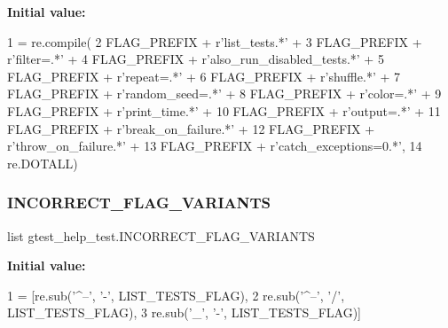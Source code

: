 {\bfseries Initial value\+:}
\begin{DoxyCode}
1 =  re.compile(
2     FLAG\_PREFIX + \textcolor{stringliteral}{r'list\_tests.*'} +
3     FLAG\_PREFIX + \textcolor{stringliteral}{r'filter=.*'} +
4     FLAG\_PREFIX + \textcolor{stringliteral}{r'also\_run\_disabled\_tests.*'} +
5     FLAG\_PREFIX + \textcolor{stringliteral}{r'repeat=.*'} +
6     FLAG\_PREFIX + \textcolor{stringliteral}{r'shuffle.*'} +
7     FLAG\_PREFIX + \textcolor{stringliteral}{r'random\_seed=.*'} +
8     FLAG\_PREFIX + \textcolor{stringliteral}{r'color=.*'} +
9     FLAG\_PREFIX + \textcolor{stringliteral}{r'print\_time.*'} +
10     FLAG\_PREFIX + \textcolor{stringliteral}{r'output=.*'} +
11     FLAG\_PREFIX + \textcolor{stringliteral}{r'break\_on\_failure.*'} +
12     FLAG\_PREFIX + \textcolor{stringliteral}{r'throw\_on\_failure.*'} +
13     FLAG\_PREFIX + \textcolor{stringliteral}{r'catch\_exceptions=0.*'},
14     re.DOTALL)
\end{DoxyCode}
\mbox{\label{namespacegtest__help__test_a6f677b9f975f09db7604a5ee9c4821a3}} 
\subsubsection{\texorpdfstring{I\+N\+C\+O\+R\+R\+E\+C\+T\+\_\+\+F\+L\+A\+G\+\_\+\+V\+A\+R\+I\+A\+N\+TS}{INCORRECT\_FLAG\_VARIANTS}}
{\footnotesize\ttfamily list gtest\+\_\+help\+\_\+test.\+I\+N\+C\+O\+R\+R\+E\+C\+T\+\_\+\+F\+L\+A\+G\+\_\+\+V\+A\+R\+I\+A\+N\+TS}

{\bfseries Initial value\+:}
\begin{DoxyCode}
1 =  [re.sub(\textcolor{stringliteral}{'^--'}, \textcolor{stringliteral}{'-'}, LIST\_TESTS\_FLAG),
2                            re.sub(\textcolor{stringliteral}{'^--'}, \textcolor{stringliteral}{'/'}, LIST\_TESTS\_FLAG),
3                            re.sub(\textcolor{stringliteral}{'\_'}, \textcolor{stringliteral}{'-'}, LIST\_TESTS\_FLAG)]
\end{DoxyCode}
\mbox{\label{namespacegtest__help__test_aa7f487cde98f691eecc5f1f5e67c0a69}} 
